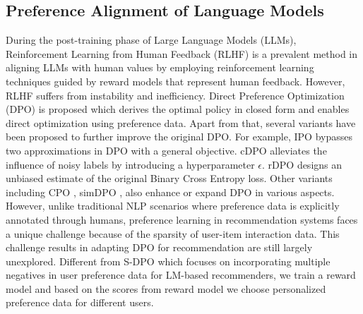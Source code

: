 \subsection{Preference Alignment of Language Models}
During the post-training \cite{dubey2024llama} phase of Large Language Models (LLMs), Reinforcement Learning from Human Feedback (RLHF) \cite{stiennon2020learning, ouyang2022training} is a prevalent method in aligning LLMs with human values by employing reinforcement learning techniques guided by reward models that represent human feedback. However, RLHF suffers from instability and inefficiency. Direct Preference Optimization (DPO) \cite{rafailov2024direct} is proposed which derives the optimal policy in closed form and enables direct optimization using preference data. Apart from that, several variants have been proposed to further improve the original DPO. For example, IPO \cite{azar2024general} bypasses two approximations in DPO with a general objective. cDPO \cite{rafailov2024direct} alleviates the influence of noisy labels by introducing a hyperparameter $\epsilon$. rDPO \cite{chowdhury2024provably} designs an unbiased estimate of the original Binary Cross Entropy loss. Other variants including CPO \cite{xu2024contrastive}, simDPO \cite{chowdhury2024provably}, also enhance or expand
DPO in various aspects. However, unlike traditional NLP scenarios where preference data is explicitly annotated through humans, preference learning in recommendation systems faces a unique challenge because of the sparsity of user-item interaction data. This challenge results in adapting DPO for recommendation are still largely unexplored. Different from S-DPO which focuses on incorporating multiple negatives in user preference data for LM-based recommenders, we train a reward model and based on the scores from reward model we choose personalized preference data for different users.

\vspace{-0.4cm}